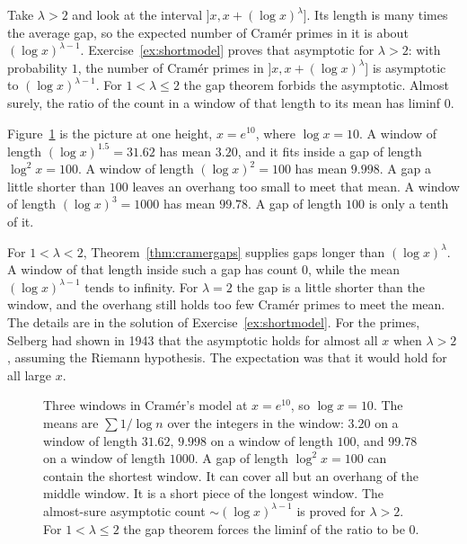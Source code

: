 Take $\lambda>2$ and look at the interval $]x,x+(\log x)^\lambda]$. Its length is many times the average gap, so the expected number of Cramér primes in it is about $(\log x)^{\lambda-1}$. Exercise~\ref{ex:shortmodel} proves that asymptotic for $\lambda>2$: with probability $1$, the number of Cramér primes in $]x,x+(\log x)^\lambda]$ is asymptotic to $(\log x)^{\lambda-1}$. For $1<\lambda\le 2$ the gap theorem forbids the asymptotic. Almost surely, the ratio of the count in a window of that length to its mean has liminf $0$.

Figure~\ref{fig:cramerwindows} is the picture at one height, $x=e^{10}$, where $\log x=10$. A window of length $(\log x)^{1.5}=31.62$ has mean $3.20$, and it fits inside a gap of length $\log^2 x=100$. A window of length $(\log x)^2=100$ has mean $9.998$. A gap a little shorter than $100$ leaves an overhang too small to meet that mean. A window of length $(\log x)^3=1000$ has mean $99.78$. A gap of length $100$ is only a tenth of it.

For $1<\lambda<2$, Theorem~\ref{thm:cramergaps} supplies gaps longer than $(\log x)^\lambda$. A window of that length inside such a gap has count $0$, while the mean $(\log x)^{\lambda-1}$ tends to infinity. For $\lambda=2$ the gap is a little shorter than the window, and the overhang still holds too few Cramér primes to meet the mean. The details are in the solution of Exercise~\ref{ex:shortmodel}. For the primes, Selberg had shown in 1943 that the asymptotic holds for almost all $x$ when $\lambda>2$, assuming the Riemann hypothesis. The expectation was that it would hold for all large $x$.

\begin{figure}[ht]
\centering
{}
\caption{Three windows in Cramér's model at $x=e^{10}$, so $\log x=10$. The means are $\sum 1/\log n$ over the integers in the window: $3.20$ on a window of length $31.62$, $9.998$ on a window of length $100$, and $99.78$ on a window of length $1000$. A gap of length $\log^2 x=100$ can contain the shortest window. It can cover all but an overhang of the middle window. It is a short piece of the longest window. The almost-sure asymptotic count $\sim(\log x)^{\lambda-1}$ is proved for $\lambda>2$. For $1<\lambda\le2$ the gap theorem forces the liminf of the ratio to be $0$.}
\label{fig:cramerwindows}
\end{figure}

